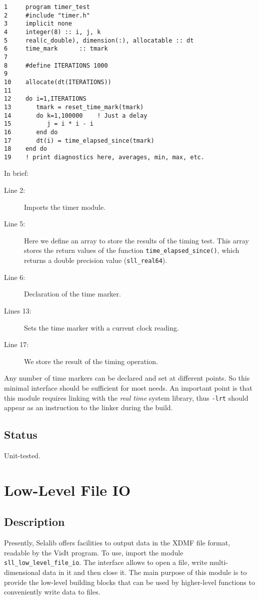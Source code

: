 \documentclass[]{report}   %
\begin{document}
\begin{verbatim}
1     program timer_test
2     #include "timer.h"
3     implicit none
4     integer(8) :: i, j, k
5     real(c_double), dimension(:), allocatable :: dt
6     time_mark      :: tmark
7
8     #define ITERATIONS 1000
9 
10    allocate(dt(ITERATIONS))
11
12    do i=1,ITERATIONS
13       tmark = reset_time_mark(tmark)
14       do k=1,100000    ! Just a delay
15          j = i * i - i
16       end do
17       dt(i) = time_elapsed_since(tmark) 
18    end do
19    ! print diagnostics here, averages, min, max, etc.
\end{verbatim}

In brief:
\begin{description}
\item[Line 2:]
Imports the timer module. 

\item[Line 5:]
Here we define an array to store the results of the timing test. This array stores the return values of the function \verb+time_elapsed_since()+, which returns a double precision value (\verb+sll_real64+).

\item[Line 6: ]
Declaration of the time marker.

\item[Lines 13:]
Sets the time marker with a current clock reading.

\item[Line 17:]
We store the result of the timing operation.
\end{description}

Any number of time markers can be declared and set at different points. So this minimal interface should be sufficient for most needs. An important point is that this module requires linking with the \emph{real time} system library, thus \verb+-lrt+ should appear as an instruction to the linker during the build.

\subsection{Status}
Unit-tested.

\section{Low-Level File IO}

    \subsection{Description}
	Presently, Selalib offers facilities to output data in the XDMF file format, readable by the VisIt program. To use, import the module \verb+sll_low_level_file_io+. The interface allows to open a file, write multi-dimensional data in it and then close it. The main purpose of this module is to provide the low-level building blocks that can be used by higher-level functions to conveniently write data to files.
\end{document}
